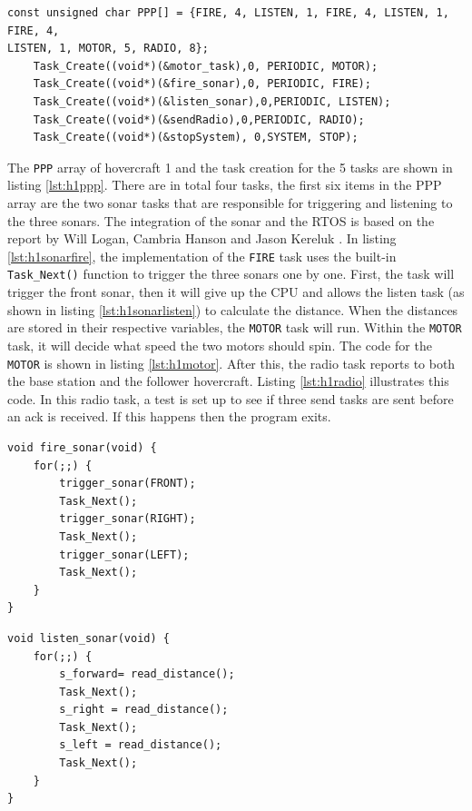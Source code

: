 \begin{lstlisting}[float=th,label=lst:h1ppp,
                   caption={\texttt{PPP} array and task creation for hovercraft 1}]
const unsigned char PPP[] = {FIRE, 4, LISTEN, 1, FIRE, 4, LISTEN, 1, FIRE, 4,
LISTEN, 1, MOTOR, 5, RADIO, 8};
    Task_Create((void*)(&motor_task),0, PERIODIC, MOTOR);
    Task_Create((void*)(&fire_sonar),0, PERIODIC, FIRE);
    Task_Create((void*)(&listen_sonar),0,PERIODIC, LISTEN);
    Task_Create((void*)(&sendRadio),0,PERIODIC, RADIO);
	Task_Create((void*)(&stopSystem), 0,SYSTEM, STOP); 
\end{lstlisting}
The \texttt{PPP} array of hovercraft 1 and the task creation for the 5 tasks are shown in listing \ref{lst:h1ppp}.
There are in total four tasks, the first six items in the PPP array are the
two sonar tasks that are responsible for triggering and listening
to the three sonars. The integration of the sonar and the RTOS is based on the report by Will
Logan, Cambria Hanson and Jason Kereluk \cite{autoB}. In listing \ref{lst:h1sonarfire}, the implementation of the
\texttt{FIRE} task uses the built-in \texttt{Task\_Next()} function to trigger
the three sonars one by one. First, the task will trigger the front sonar, then
it will give up the CPU and allows the listen task (as shown in listing
\ref{lst:h1sonarlisten}) to calculate the distance. When the distances are
stored in their respective variables, the \texttt{MOTOR} task will run. Within
the \texttt{MOTOR} task, it will decide what speed the two motors should spin.
The code for the \texttt{MOTOR} is shown in listing \ref{lst:h1motor}. After
this, the radio task reports to both the base station and the follower
hovercraft. Listing \ref{lst:h1radio} illustrates this code. In this radio task, a test is set up to see if
three send tasks are sent before an ack is received. If this happens then the
program exits.

\begin{lstlisting}[float=thp,label=lst:h1sonarfire,
                   caption={\texttt{FIRE} Task}]
void fire_sonar(void) {
	for(;;) {
		trigger_sonar(FRONT);
		Task_Next();
		trigger_sonar(RIGHT);
		Task_Next();
		trigger_sonar(LEFT);
		Task_Next();
	}
}
\end{lstlisting}

\begin{lstlisting}[label=lst:h1sonarlisten,float=tbh,
                   caption={\texttt{LISTEN} Task}]
void listen_sonar(void) {
	for(;;)	{
	    s_forward= read_distance();
	    Task_Next();
	    s_right = read_distance();
	    Task_Next();
	    s_left = read_distance();
	    Task_Next();
	}
}
\end{lstlisting}

